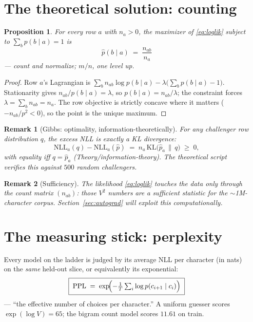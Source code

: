 \documentclass[11pt]{article}
\newtheorem{proposition}{Proposition}
\newtheorem{remark}{Remark}
\begin{document}
\section{The theoretical solution: counting}

\begin{proposition}
For every row $a$ with $n_a > 0$, the maximizer of \eqref{eq:loglik}
subject to $\sum_b p(b \mid a) = 1$ is
\begin{equation}
  \boxed{\;\hat{p}(b \mid a) \;=\; \frac{n_{ab}}{n_a}\;}
  \label{eq:counts}
\end{equation}
--- count and normalize; $m/n$, one level up.
\end{proposition}

\begin{proof}
Row $a$'s Lagrangian is
$\sum_b n_{ab} \log p(b\mid a) - \lambda\bigl(\sum_b p(b \mid a)-1\bigr)$.
Stationarity gives $n_{ab}/p(b \mid a) = \lambda$, so
$p(b \mid a) = n_{ab}/\lambda$; the constraint forces
$\lambda = \sum_b n_{ab} = n_a$. The row objective is strictly concave
where it matters ($-n_{ab}/p^2 < 0$), so the point is the unique
maximum.
\end{proof}

\begin{remark}[Gibbs: optimality, information-theoretically]
For any challenger row distribution $q$, the excess NLL is exactly a
KL divergence:
\begin{equation}
  \mathrm{NLL}_a(q) - \mathrm{NLL}_a(\hat{p})
  \;=\; n_a\,\mathrm{KL}\bigl(\hat{p}_a \,\|\, q\bigr) \;\ge\; 0,
  \label{eq:gibbs}
\end{equation}
with equality iff $q = \hat{p}_a$ (Theory/information-theory). The
theoretical script verifies this against $500$ random challengers.
\end{remark}

\begin{remark}[Sufficiency]
The likelihood \eqref{eq:loglik} touches the data only through the
count matrix $(n_{ab})$: those $V^2$ numbers are a sufficient statistic
for the $\sim$1M-character corpus. Section~\ref{sec:autograd} will
exploit this computationally.
\end{remark}

\section{The measuring stick: perplexity}

Every model on the ladder is judged by its average NLL per character
(in nats) on the \emph{same} held-out slice, or equivalently its
exponential:
\begin{equation}
  \boxed{\;\mathrm{PPL} \;=\; \exp\!\Bigl(-\tfrac1T
  \textstyle\sum_i \log p(c_{i+1}\mid c_i)\Bigr)\;}
  \label{eq:ppl}
\end{equation}
--- ``the effective number of choices per character.'' A uniform
guesser scores $\exp(\log V) = 65$; the bigram count model scores
$11.61$ on train.
\end{document}
